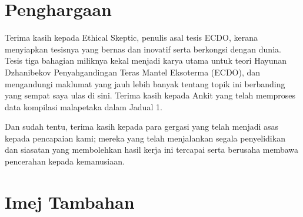 \documentclass[10pt,twocolumn,letterpaper]{article}
\begin{document}
\section{Penghargaan}

Terima kasih kepada Ethical Skeptic, penulis asal tesis ECDO, kerana menyiapkan tesisnya yang bernas dan inovatif serta berkongsi dengan dunia. Tesis tiga bahagian \cite{1} miliknya kekal menjadi karya utama untuk teori Hayunan Dzhanibekov Penyahgandingan Teras Mantel Eksoterma (ECDO), dan mengandungi maklumat yang jauh lebih banyak tentang topik ini berbanding yang sempat saya ulas di sini.
Terima kasih kepada Ankit yang telah memproses data kompilasi malapetaka dalam Jadual 1.

Dan sudah tentu, terima kasih kepada para gergasi yang telah menjadi asas kepada pencapaian kami; mereka yang telah menjalankan segala penyelidikan dan siasatan yang membolehkan hasil kerja ini tercapai serta berusaha membawa pencerahan kepada kemanusiaan.

\clearpage
\twocolumn

\section{Imej Tambahan}
\end{document}
